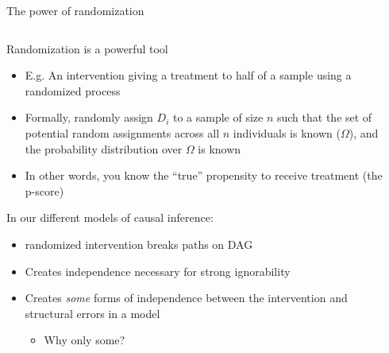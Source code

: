 \documentclass[notes,11pt, aspectratio=169]{beamer}
\newenvironment{wideitemize}{\itemize\addtolength{\itemsep}{10pt}}{\enditemize}
\begin{document}
\begin{frame}{The power of randomization}
\begin{columns}[T] %
\begin{column}{.65\textwidth}
  \begin{wideitemize}
  \item Randomization is a powerful tool
    \begin{itemize}
    \item E.g. An intervention giving a treatment to half of a sample
      using a randomized process
    \item Formally, randomly assign $D_{i}$ to a sample of size
      $n$ such that the set of potential random assignments across all
      $n$ individuals is known ($\Omega$), and the probability
      distribution over $\Omega$ is known
    \item In other words, you know the ``true'' propensity to receive treatment (the p-score)
    \end{itemize}
  \item In our different models of causal inference:
    \begin{itemize}
    \item<2-> randomized intervention breaks paths on DAG      
    \item<4-> Creates independence necessary for strong ignorability
    \item<5-> Creates \emph{some} forms of independence between the
      intervention and structural errors in a model
      \begin{itemize}
      \item Why only some?
      \end{itemize}
    \end{itemize}
  \end{wideitemize}
\end{column}%
\hfill%
\begin{column}{.4\textwidth}
  \begin{center}
\end{center}
\end{column}
\end{columns}
\end{frame}
\end{document}
